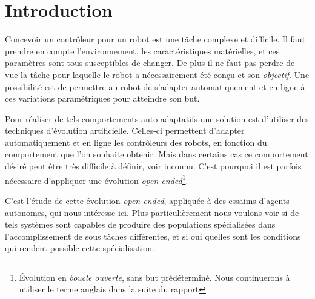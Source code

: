 \documentclass[a4paper,10pt]{report}
\begin{document}
\chapter{Introduction}



Concevoir un contrôleur pour un robot est une tâche complexe et difficile. Il faut prendre en compte l'environnement, les caractéristiques matérielles, et ces paramètres sont tous susceptibles de changer. De plus il ne faut pas perdre de vue la tâche pour laquelle le robot a nécessairement été con\c cu et son \emph{objectif}. Une possibilité est de permettre au robot de s'adapter automatiquement et en ligne à ces variations paramétriques pour atteindre son but.

Pour réaliser de tels comportements auto-adaptatifs une solution est d'utiliser des techniques d'évolution artificielle. Celles-ci permettent d'adapter automatiquement et en ligne les contrôleurs des robots, en fonction du comportement que l'on souhaite obtenir. Mais dans certains cas ce comportement désiré peut être très difficile à définir, voir inconnu. C'est pourquoi il est parfois nécessaire d'appliquer une évolution \emph{open-ended}\footnote{\'{E}volution en \emph{boucle ouverte}, sans but prédéterminé. Nous continuerons à utiliser le terme anglais dans la suite du rapport}.

C'est l'étude de cette évolution \emph{open-ended}, appliquée à des essaims d'agents autonomes, qui nous intéresse ici. Plus particulièrement nous voulons voir si de tels systèmes sont capables de produire des populations spécialisées dans l'accomplissement de sous tâches différentes, et si oui quelles sont les conditions qui rendent possible cette spécialisation.





\end{document}
